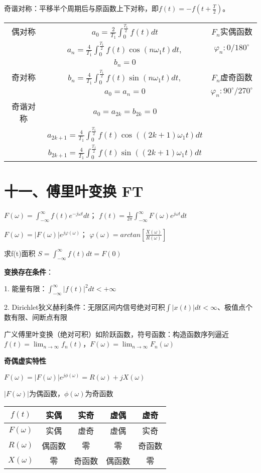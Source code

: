 奇谐对称：平移半个周期后与原函数上下对称，即$f(t)=-f(t+\frac{T}{2})$。

\begin{tabular}{c|c|c}
偶对称 & $a_0=\frac{2}{T_1}\int_0^{\frac{T_1}{2}}f(t)dt$ & $F_n$实偶函数 \\
 & $a_n=\frac{4}{T_1}\int_0^{\frac{T_1}{2}}f(t)\cos(n\omega_1t)dt,$ & $\varphi_n : 0/180^\circ$ \\
 & $b_n=0$ & \\
\hline
奇对称 & $b_n=\frac{4}{T_1}\int_0^{\frac{T_1}{2}}f(t)\sin(n\omega_1t)dt,$ & $F_n$虚奇函数 \\
 & $a_0=a_n=0$ & $\varphi_n :90^\circ/270^\circ$ \\
\hline
奇谐对称 & $a_0=a_{2k}=b_{2k}=0$ & \\
 & $a_{2k+1}=\frac{4}{T_1}\int_0^{\frac{T_1}{2}}f(t)\cos((2k+1)\omega_1t)dt$ & \\
 & $b_{2k+1}=\frac{4}{T_1}\int_0^{\frac{T_1}{2}}f(t)\sin((2k+1)\omega_1t)dt$ & \\
\end{tabular}

\section*{十一、傅里叶变换 FT}

$F(\omega)=\int_{-\infty}^{\infty}f(t)e^{-j\omega t}dt$； $f(t)=\frac{1}{2\pi}\int_{-\infty}^{\infty}F(\omega)e^{j\omega t}dt$

$F(\omega) = |F(\omega)|e^{j\varphi(\omega)}$； $\varphi(\omega)=arctan[\frac{X(\omega)}{R(\omega)}]$

求f(t)面积 $S=\int_{-\infty}^\infty f(t)dt=F(0)$

\textbf{变换存在条件}：

1. 能量有限：$\int_{-\infty}^{\infty}|f(t)|^2 dt<+\infty$

2. Dirichlet狄义赫利条件：无限区间内信号绝对可积$\int|x(t)|dt<\infty$、极值点个数有限、间断点有限

广义傅里叶变换（绝对可积）如阶跃函数，符号函数：构造函数序列逼近  
$f(t)=\lim_{n\rightarrow\infty} f_n(t)$，$F(\omega)=\lim_{n\rightarrow\infty} F_n(\omega)$

\textbf{奇偶虚实特性}

$F(\omega)=|F(\omega)|e^{j\phi(\omega)}=R(\omega)+jX(\omega)$

$|F(\omega)|$为偶函数，$\phi(\omega)$为奇函数

\begin{tabular}{c|cccc}
$f(t)$ & 实偶 & 实奇 & 虚偶 & 虚奇 \\
\hline
$F(\omega)$ & 实偶 & 虚奇 & 虚偶 & 实奇 \\
$R(\omega)$ & 偶函数 & 零 & 零 & 奇函数 \\
$X(\omega)$ & 零 & 奇函数 & 偶函数 & 零 \\
\end{tabular}

